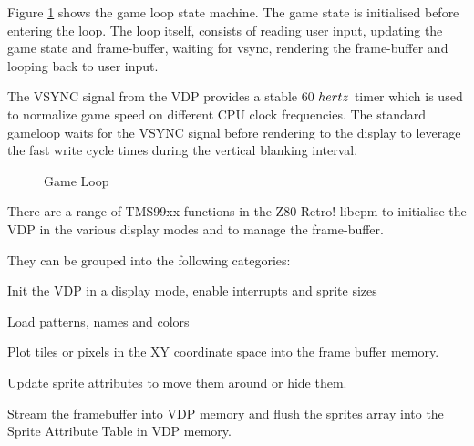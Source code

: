\documentclass[10pt,a4paper,hidelinks]{article}
\def\lib{Z80-Retro!-libcpm }
\begin{document}
Figure \ref{fig:gameloop} shows the game loop state machine.  The game state is
initialised before entering the loop.  The loop itself, consists of reading user
input, updating the game state and frame-buffer, waiting for vsync, rendering
the frame-buffer and looping back to user input.

The VSYNC signal from the VDP provides a stable 60 ${\\hertz}$ timer which is
used to normalize game speed on different CPU clock frequencies.  The standard
gameloop waits for the VSYNC signal before rendering to the display to leverage
the fast write cycle times during the vertical blanking interval.

\begin{figure}[H]
  \begin{center}
  \end{center}
  \caption{Game Loop}
\label{fig:gameloop}
\end{figure}

There are a range of TMS99xx functions in the \lib to initialise the VDP in the
various display modes and to manage the frame-buffer.

They can be grouped into the following categories:

\begin{description}[font=$\bullet$~\normalfont\scshape\color{red!50!black}]
  \item[Initialization]
    Init the VDP in a display mode, enable interrupts and
    sprite sizes
  \item[Loading data]
    Load patterns, names and colors
  \item[Plotting to the frame buffer]
    Plot tiles or pixels in the XY coordinate
    space into the frame buffer memory.
  \item[Sprites]
    Update sprite attributes to move them around or hide them.
  \item[Flushing the frame buffer to the video memory]
    Stream the framebuffer
    into VDP memory and flush the sprites array into the Sprite Attribute Table in
    VDP memory.
\end{description}
\end{document}

